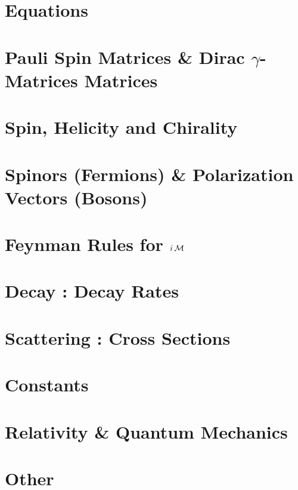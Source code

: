 \documentclass[landscape,8pt,a4paper,english]{extarticle}
\begin{document}
\begin{multicols*}{3}\centering
        \section*{Equations}
        \section*{Pauli Spin Matrices \& Dirac $\gamma$-Matrices Matrices}
        \section*{Spin, Helicity and Chirality}
        \section*{Spinors (Fermions) \& Polarization Vectors (Bosons)}
        \section*{Feynman Rules for $i\operatorname{\mathcal{M}}$}
        \section*{Decay : Decay Rates}
        \section*{Scattering : Cross Sections}
        \section*{Constants}
        \section*{Relativity \& Quantum Mechanics}
        \section*{Other}
\end{multicols*}
\end{document}

